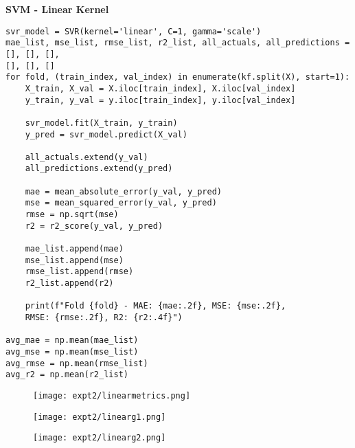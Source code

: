 \documentclass[11pt]{article}
\begin{document}
\vspace{1.7cm}
\textbf{SVM - Linear Kernel}
\begin{verbatim}
svr_model = SVR(kernel='linear', C=1, gamma='scale')
mae_list, mse_list, rmse_list, r2_list, all_actuals, all_predictions = [], [], [],
[], [], []
for fold, (train_index, val_index) in enumerate(kf.split(X), start=1):
    X_train, X_val = X.iloc[train_index], X.iloc[val_index]
    y_train, y_val = y.iloc[train_index], y.iloc[val_index]

    svr_model.fit(X_train, y_train)
    y_pred = svr_model.predict(X_val)

    all_actuals.extend(y_val)
    all_predictions.extend(y_pred)

    mae = mean_absolute_error(y_val, y_pred)
    mse = mean_squared_error(y_val, y_pred)
    rmse = np.sqrt(mse)
    r2 = r2_score(y_val, y_pred)

    mae_list.append(mae)
    mse_list.append(mse)
    rmse_list.append(rmse)
    r2_list.append(r2)

    print(f"Fold {fold} - MAE: {mae:.2f}, MSE: {mse:.2f}, 
    RMSE: {rmse:.2f}, R2: {r2:.4f}")

avg_mae = np.mean(mae_list)
avg_mse = np.mean(mse_list)
avg_rmse = np.mean(rmse_list)
avg_r2 = np.mean(r2_list)
\end{verbatim}

\begin{figure}[H]
\centering
\texttt{[image: expt2/linearmetrics.png]} 
\end{figure}

\begin{figure}[H]
\centering
\texttt{[image: expt2/linearg1.png]} 
\end{figure}

\begin{figure}[H]
\centering
\texttt{[image: expt2/linearg2.png]} 
\end{figure}
\end{document}
